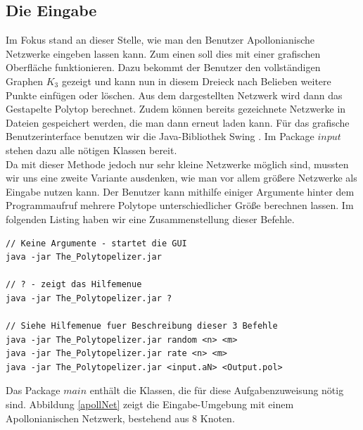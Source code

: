 \subsection*{Die Eingabe}
Im Fokus stand an dieser Stelle, wie man den Benutzer Apollonianische Netzwerke eingeben lassen kann. Zum einen soll dies mit einer grafischen Oberfläche funktionieren. Dazu bekommt der Benutzer den vollständigen Graphen $K_3$ gezeigt und kann nun in diesem Dreieck nach Belieben weitere Punkte einfügen oder löschen. Aus dem dargestellten Netzwerk wird dann das Gestapelte Polytop berechnet. Zudem können bereits gezeichnete Netzwerke in Dateien gespeichert werden, die man dann erneut laden kann. Für das grafische Benutzerinterface benutzen wir die Java-Bibliothek Swing \cite{swing}. Im Package $input$ stehen dazu alle nötigen Klassen bereit.\\
Da mit dieser Methode jedoch nur sehr kleine Netzwerke möglich sind, mussten wir uns eine zweite Variante ausdenken, wie man vor allem größere Netzwerke als Eingabe nutzen kann. Der Benutzer kann mithilfe einiger Argumente hinter dem Programmaufruf mehrere Polytope unterschiedlicher Größe berechnen lassen. Im folgenden Listing haben wir eine Zusammenstellung dieser Befehle.

\begin{lstlisting}[caption={Kommandozeilen-Befehle}]
// Keine Argumente - startet die GUI
java -jar The_Polytopelizer.jar

// ? - zeigt das Hilfemenue
java -jar The_Polytopelizer.jar ?

// Siehe Hilfemenue fuer Beschreibung dieser 3 Befehle
java -jar The_Polytopelizer.jar random <n> <m>
java -jar The_Polytopelizer.jar rate <n> <m>
java -jar The_Polytopelizer.jar <input.aN> <Output.pol>

\end{lstlisting}

Das Package $main$ enthält die Klassen, die für diese Aufgabenzuweisung nötig sind. Abbildung \ref{apollNet} zeigt die Eingabe-Umgebung mit einem Apollonianischen Netzwerk, bestehend aus 8 Knoten.

